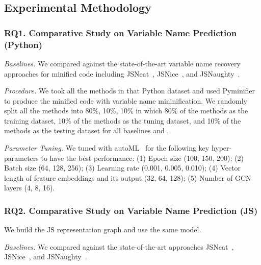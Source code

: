 \subsection{Experimental Methodology}
\label{empirical-method}

\subsubsection{RQ1. Comparative Study on Variable Name Prediction (Python)\\}
{\em Baselines.} We compared {\tool} against the state-of-the-art
variable name recovery approaches for minified code including
JSNeat~\cite{icse19}, JSNice~\cite{JSNice2015}, and
JSNaughty~\cite{JSNaughty2017}.

\textit{Procedure.} We took all the methods in that Python dataset
and used Pyminifier to produce the minified code with variable name
mininification. We randomly split all the methods into 80\%, 10\%,
10\% in which 80\% of the methods as the training dataset, 10\% of the
methods as the tuning dataset, and 10\% of the methods as the testing
dataset for all baselines and {\tool}.


{\em Parameter Tuning.} We tuned {\tool} with autoML~\cite{NNI} for
the following key hyper-parameters to have the best performance: (1)
Epoch size (100, 150, 200); (2) Batch size (64, 128, 256); (3)
Learning rate (0.001, 0.005, 0.010); (4) Vector length of feature
embeddings and its output (32, 64, 128); (5) Number of GCN layers (4,
8, 16).

    
\subsubsection{RQ2. Comparative Study on Variable Name Prediction (JS)\\}

We build the JS representation graph and use the same model.
    
{\em Baselines.} We compared {\tool} against the state-of-the-art
approaches JSNeat~\cite{icse19}, JSNice~\cite{JSNice2015}, and
JSNaughty~\cite{JSNaughty2017}.

